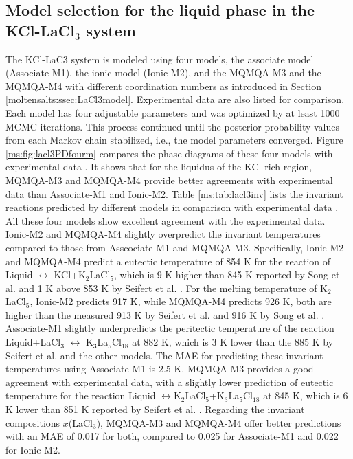 \subsection{Model selection for the liquid phase in the KCl-LaCl$_3$ system} \label{moltensalts:ssec:LaCl3modelselection}
The KCl-LaC3 system is modeled using four models, the associate model (Associate-M1), the ionic model (Ionic-M2), and the MQMQA-M3 and the MQMQA-M4 with different coordination numbers as introduced in Section \ref{moltensalts:ssec:LaCl3model}. Experimental data are also listed for comparison. Each model has four adjustable parameters and was optimized by at least 1000 MCMC iterations. This process continued until the posterior probability values from each Markov chain stabilized, i.e., the model parameters converged. Figure \ref{ms:fig:lacl3PDfourm} compares the phase diagrams of these four models with experimental data \cite{seifert1985thermodynamic, song1995investigation}. It shows that for the liquidus of the KCl-rich region, MQMQA-M3 and MQMQA-M4 provide better agreements with experimental data than Associate-M1 and Ionic-M2. Table \ref{ms:tab:lacl3inv} lists the invariant reactions predicted by different models in comparison with experimental data \cite{seifert1985thermodynamic, song1995investigation}. All these four models show excellent agreement with the experimental data. Ionic-M2 and MQMQA-M4 slightly overpredict the invariant temperatures compared to those from Asscociate-M1 and MQMQA-M3. Specifically, Ionic-M2 and MQMQA-M4 predict a eutectic temperature of 854 K for the reaction of Liquid $\leftrightarrow$ KCl+K$_2$LaCl$_5$, which is 9 K higher than 845 K reported by Song et al. \cite{song1995investigation} and 1 K above 853 K by Seifert et al. \cite{seifert1985thermodynamic}. For the melting temperature of K$_2$LaCl$_5$, Ionic-M2 predicts 917 K, while MQMQA-M4 predicts 926 K, both are higher than the measured 913 K by Seifert et al. \cite{seifert1985thermodynamic} and 916 K by Song et al. \cite{song1995investigation}. Associate-M1 slightly underpredicts the peritectic temperature of the reaction Liquid+LaCl$_3$ $\leftrightarrow$ K$_3$La$_5$Cl$_{18}$ at 882 K, which is 3 K lower than the 885 K by Seifert et al. \cite{seifert1985thermodynamic} and the other models. The MAE for predicting these invariant temperatures using Associate-M1 is 2.5 K. MQMQA-M3 provides a good agreement with experimental data, with a slightly lower prediction of eutectic temperature for the reaction Liquid $\leftrightarrow $K$_2$LaCl$_5$+K$_3$La$_5$Cl$_{18}$ at 845 K, which is 6 K lower than 851 K reported by Seifert et al. \cite{seifert1985thermodynamic}. Regarding the invariant compositions $x$(LaCl$_3$), MQMQA-M3 and MQMQA-M4 offer better predictions with an MAE of 0.017 for both, compared to 0.025 for Associate-M1 and 0.022 for Ionic-M2. 

